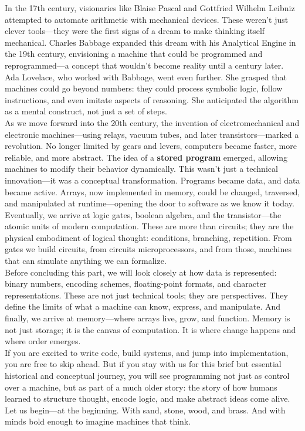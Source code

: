 \documentclass[12pt, oneside]{book}
\begin{document}
In the 17th century, visionaries like Blaise Pascal and Gottfried Wilhelm Leibniz attempted to automate arithmetic with mechanical devices. These weren’t just clever tools—they were the first signs of a dream to make thinking itself mechanical. Charles Babbage expanded this dream with his Analytical Engine in the 19th century, envisioning a machine that could be programmed and reprogrammed—a concept that wouldn’t become reality until a century later. Ada Lovelace, who worked with Babbage, went even further. She grasped that machines could go beyond numbers: they could process symbolic logic, follow instructions, and even imitate aspects of reasoning. She anticipated the algorithm as a mental construct, not just a set of steps.\\
As we move forward into the 20th century, the invention of electromechanical and electronic machines—using relays, vacuum tubes, and later transistors—marked a revolution. No longer limited by gears and levers, computers became faster, more reliable, and more abstract. The idea of a \textbf{stored program} emerged, allowing machines to modify their behavior dynamically. This wasn’t just a technical innovation—it was a conceptual transformation. Programs became data, and data became active. Arrays, now implemented in memory, could be changed, traversed, and manipulated at runtime—opening the door to software as we know it today.\\
Eventually, we arrive at logic gates, boolean algebra, and the transistor—the atomic units of modern computation. These are more than circuits; they are the physical embodiment of logical thought: conditions, branching, repetition. From gates we build circuits, from circuits microprocessors, and from those, machines that can simulate anything we can formalize.\\
Before concluding this part, we will look closely at how data is represented: binary numbers, encoding schemes, floating-point formats, and character representations. These are not just technical tools; they are perspectives. They define the limits of what a machine can know, express, and manipulate. And finally, we arrive at memory—where arrays live, grow, and function. Memory is not just storage; it is the canvas of computation. It is where change happens and where order emerges.\\
If you are excited to write code, build systems, and jump into implementation, you are free to skip ahead. But if you stay with us for this brief but essential historical and conceptual journey, you will see programming not just as control over a machine, but as part of a much older story: the story of how humans learned to structure thought, encode logic, and make abstract ideas come alive.\\
Let us begin—at the beginning. With sand, stone, wood, and brass. And with minds bold enough to imagine machines that think.
\end{document}
